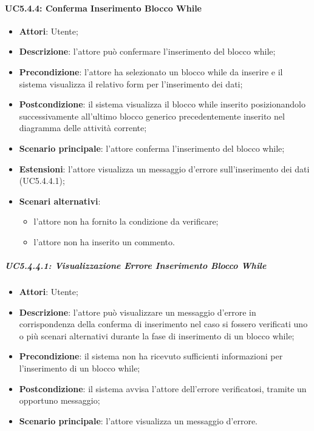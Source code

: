 \begin{itemize}
\begin{itemize}
\begin{itemize}
\begin{itemize}
\paragraph{UC5.4.4: Conferma Inserimento Blocco While}
\label{UC5.4.4}
\begin{itemize}
	\item \textbf{Attori}: Utente;
	\item \textbf{Descrizione}: l'attore può confermare l'inserimento del blocco while;
	\item \textbf{Precondizione}: l'attore ha selezionato un blocco while da inserire e il sistema visualizza il relativo form per l'inserimento dei dati;
	\item \textbf{Postcondizione}: il sistema visualizza il blocco while inserito posizionandolo successivamente all'ultimo blocco generico precedentemente inserito nel diagramma delle attività corrente;
	\item \textbf{Scenario principale}: l'attore conferma l'inserimento del blocco while;
	\item \textbf{Estensioni}: l'attore visualizza un messaggio d'errore sull'inserimento dei dati (UC5.4.4.1);
	\item \textbf{Scenari alternativi}:
	\begin{itemize}
		\item l'attore non ha fornito la condizione da verificare;
		\item l'attore non ha inserito un commento.
	\end{itemize}
\end{itemize}

\subparagraph{UC5.4.4.1: Visualizzazione Errore Inserimento Blocco While}
\label{UC5.4.4.1}
\begin{itemize}
	\item \textbf{Attori}: Utente;
	\item \textbf{Descrizione}: l'attore può visualizzare un messaggio d'errore in corrispondenza della conferma di inserimento nel caso si fossero verificati uno o più scenari alternativi durante la fase di inserimento di un blocco while;
	\item \textbf{Precondizione}: il sistema non ha ricevuto sufficienti informazioni per l'inserimento di un blocco while;
	\item \textbf{Postcondizione}: il sistema avvisa l'attore dell'errore verificatosi, tramite un opportuno messaggio;
	\item \textbf{Scenario principale}: l'attore visualizza un messaggio d'errore.
\end{itemize}


\end{itemize}
\end{itemize}
\end{itemize}
\end{itemize}
